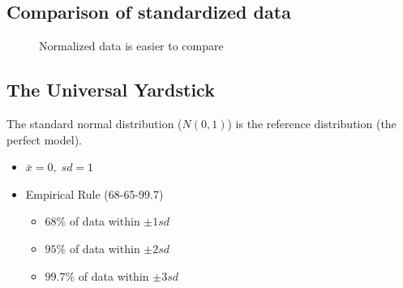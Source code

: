 \documentclass[
  a4paper,
]{scrbook}
\providecommand{\tightlist}{%
  \setlength{\itemsep}{0pt}\setlength{\parskip}{0pt}}\usepackage{longtable,booktabs,array}
\begin{document}
\subsection{Comparison of standardized
data}\label{comparison-of-standardized-data}

\begin{figure}[ht]


\caption{\label{fig-z-scores-scaled}Normalized data is easier to
compare}

\end{figure}%

\subsection{The Universal Yardstick}\label{the-universal-yardstick}

The standard normal distribution (\(N(0,1)\)) is the reference
distribution (the perfect model).

\begin{itemize}
\tightlist
\item
  \(\bar{x} = 0,\; sd = 1\)
\item
  Empirical Rule (68-65-99.7)

  \begin{itemize}
  \tightlist
  \item
    \(68\%\) of data within \(\pm1sd\)
  \item
    \(95\%\) of data within \(\pm2sd\)
  \item
    \(99.7\%\) of data within \(\pm3sd\)
  \end{itemize}
\end{itemize}
\end{document}
